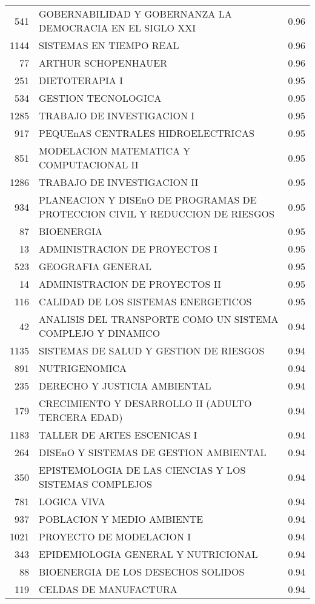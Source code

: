 \documentclass[12pt]{article}
\begin{document}
\begin{table}[ht]
\begin{tabular}{rlr}
  541 & GOBERNABILIDAD Y GOBERNANZA LA DEMOCRACIA EN EL SIGLO XXI & 0.96 \\ 
  1144 & SISTEMAS EN TIEMPO REAL & 0.96 \\ 
  77 & ARTHUR SCHOPENHAUER & 0.96 \\ 
  251 & DIETOTERAPIA I & 0.95 \\ 
  534 & GESTION TECNOLOGICA & 0.95 \\ 
  1285 & TRABAJO DE INVESTIGACION I & 0.95 \\ 
  917 & PEQUEnAS CENTRALES HIDROELECTRICAS & 0.95 \\ 
  851 & MODELACION MATEMATICA Y COMPUTACIONAL II & 0.95 \\ 
  1286 & TRABAJO DE INVESTIGACION II & 0.95 \\ 
  934 & PLANEACION Y DISEnO DE PROGRAMAS DE PROTECCION CIVIL Y REDUCCION DE RIESGOS & 0.95 \\ 
  87 & BIOENERGIA & 0.95 \\ 
  13 & ADMINISTRACION DE PROYECTOS I & 0.95 \\ 
  523 & GEOGRAFIA GENERAL & 0.95 \\ 
  14 & ADMINISTRACION DE PROYECTOS II & 0.95 \\ 
  116 & CALIDAD DE LOS SISTEMAS ENERGETICOS & 0.95 \\ 
  42 & ANALISIS DEL TRANSPORTE COMO UN SISTEMA COMPLEJO Y DINAMICO & 0.94 \\ 
  1135 & SISTEMAS DE SALUD Y GESTION DE RIESGOS & 0.94 \\ 
  891 & NUTRIGENOMICA & 0.94 \\ 
  235 & DERECHO Y JUSTICIA AMBIENTAL & 0.94 \\ 
  179 & CRECIMIENTO Y DESARROLLO II (ADULTO TERCERA EDAD) & 0.94 \\ 
  1183 & TALLER DE ARTES ESCENICAS I & 0.94 \\ 
  264 & DISEnO Y SISTEMAS DE GESTION AMBIENTAL & 0.94 \\ 
  350 & EPISTEMOLOGIA DE LAS CIENCIAS Y LOS SISTEMAS COMPLEJOS & 0.94 \\ 
  781 & LOGICA VIVA & 0.94 \\ 
  937 & POBLACION Y MEDIO AMBIENTE & 0.94 \\ 
  1021 & PROYECTO DE MODELACION I & 0.94 \\ 
  343 & EPIDEMIOLOGIA GENERAL Y NUTRICIONAL & 0.94 \\ 
  88 & BIOENERGIA DE LOS DESECHOS SOLIDOS & 0.94 \\ 
  119 & CELDAS DE MANUFACTURA & 0.94 \\ 

\end{tabular}
\end{table}
\end{document}
